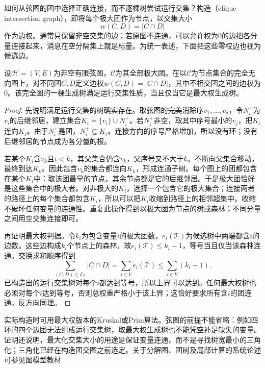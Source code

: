 如何从弦图的团中选择正确连接，而不逐棵树尝试运行交集？构造（clique intersection graph），即将每个极大团作为节点，以交集大小
\[
  w(C,D)=|C\cap D|
\]
作为边权。通常只保留非空交集的边；若原图不连通，可以允许权为$0$的边把各分量连接起来，消息在空分隔集上就是标量。为统一表述，下面把这些零权边也视为候选边。

\begin{theorem}[最大权生成树与团树]
  \label{thm:pgm-junction-tree-maximum-weight}
  设$\mathcal{H}=(V,E)$为非空有限弦图，$\mathcal{C}$为其全部极大团。在以$\mathcal{C}$为节点集合的完全无向图上，对不同团$C,D$定义边权$w(C,D)=|C\cap D|$，其中不相交团之间的边权为$0$。该完全图的一棵生成树满足运行交集性质，当且仅当它是最大权生成树。
\end{theorem}

\begin{proof}
  先说明满足运行交集的树确实存在。取弦图的完美消除序$v_1,\ldots,v_d$，令$N_i^+$为$v_i$的后继邻居，建立集合$K_i=\{v_i\}\cup N_i^+$。若$N_i^+$非空，取其中序号最小的$v_j$，把$K_i$连向$K_j$。由于$N_i^+$是团，$N_i^+\subseteq K_j$。连接方向的序号严格增加，所以没有环；没有后继邻居的节点成为各分量的根。

  若某个$K_i$含$v_k$且$i<k$，其父集合仍含$v_k$，父序号又不大于$k$。不断向父集合移动，最终到达$K_k$。因此包含$v_k$的集合都连向$K_k$，形成连通子树。每个图上的团都包含在某个$K_i$中：取该团最早的节点，其余节点都是它的后继邻居。于是极大团恰好是这些集合中的极大者。对非极大的$K_i$，选择一个包含它的极大集合；连接两者的路径上的每个集合都包含$K_i$，所以可以把$K_i$收缩到路径上的相邻超集中。收缩不破坏任何变量的连通性。重复此操作得到以极大团为节点的树或森林；不同分量之间用空交集连接即可。

  再证明最大权判据。令$k_i$为包含变量$i$的极大团数，$e_i(\mathcal{T})$为候选树中两端都含$i$的边数。这些边构成$k_i$个节点上的森林，故$e_i(\mathcal{T})\leq k_i-1$，等号当且仅当该森林连通。交换求和顺序得到
  \[
    \sum_{(C,D)\in\mathcal{E}_{\mathcal{T}}}|C\cap D|
      =\sum_{i\in V}e_i(\mathcal{T})
      \leq\sum_{i\in V}(k_i-1).
  \]
  已构造出的运行交集树对每个$i$都达到等号，所以上界可以达到。任何最大权树也必须对每个$i$达到等号，否则总权重严格小于该上界；这恰好要求所有含$i$的团连通。反方向同理。
\end{proof}

实际构造时可用最大权版本的Kruskal或Prim算法。弦图的前提不能省略：例如四环的四个边团无法组成运行交集树，取最大权生成树也不能凭空补足缺失的变量。证明还说明，最大化交集大小的用途是保证变量连通，而不是寻找树宽最小的三角化；三角化已经在构造团交图之前选定。关于分解图、团树及局部计算的系统论述可参见图模型教材


